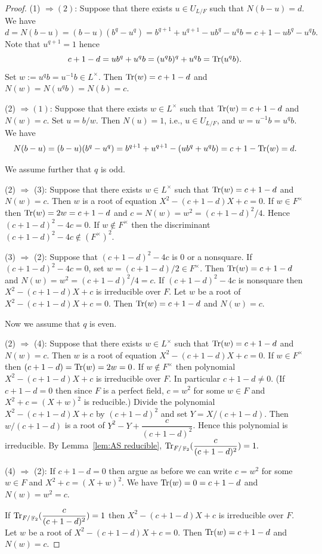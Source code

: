 \documentclass[11pt, a4paper]{amsart}
\theoremstyle{definition}
\DeclareMathOperator{\F}{\mathbb{F}}
\numberwithin{equation}{section}
\begin{document}
\begin{proof} (1) $\Rightarrow (2)$:     Suppose that there exists $u\in U_{L/F}$ such that $N(b-u)=d$. We have
    \[d=N(b-u)=(b-u)(b^q-u^q)= b^{q+1} +u^{q+1}- ub^q-u^qb=c+1- ub^q-u^qb.\]
   Note that $u^{q+1}=1$ hence  \[c+1-d= ub^q+u^qb= (u^qb)^q+u^qb={\rm Tr}(u^qb).\]
   Set $w:=u^qb=u^{-1}b\in L^\times$. Then ${\rm Tr}(w)=c+1-d$ and  
    $N(w)=N(u^qb)=N(b)=c$. 

    (2) $\Rightarrow (1)$:  Suppose that there exists $w\in L^\times$ such that ${\rm Tr}(w)=c+1-d$ and $N(w)=c$. Set $u=b/w$. Then $N(u)=1$, i.e., $u\in U_{L/F}$, and $w=u^{-1}b=u^qb$.
   We have
   \[
   N(b-u)=(b-u)(b^q-u^q)= b^{q+1} +u^{q+1}- (ub^q+u^qb)=c+1-{\rm Tr}(w)=d.
   \]

    We assume further that $q$ is odd. 

    (2) $\Rightarrow$ (3): Suppose that there exists $w\in L^\times$ such that ${\rm Tr}(w)=c+1-d$ and $N(w)=c$.
   Then $w$ is a root of equation $X^2-(c+1-d)X+c=0$. If $w\in F^\times$ then ${\rm Tr}(w)=2w=c+1-d$ and $c=N(w)=w^2=(c+1-d)^2/4$. Hence $(c+1-d)^2-4c=0$. If $w\not\in F^\times$ then the discriminant $(c+1-d)^2-4c\not\in (F^\times)^2$.

   (3) $\Rightarrow$ (2): Suppose that $(c+1-d)^2-4c$ is  0 or a nonsquare. If $(c+1-d)^2-4c=0$, set $w=(c+1-d)/2\in F^\times$. Then ${\rm Tr}(w)=c+1-d$ and $N(w)=w^2=(c+1-d)^2/4=c$. 
   If $(c+1-d)^2-4c$ is nonsquare then $X^2-(c+1-d)X+c$ is irreducible over $F$. Let $w$ be a root of $X^2-(c+1-d)X+c=0$.  
 Then ${\rm Tr}(w)=c+1-d$ and $N(w)=c$. 


 Now we assume that $q$ is even.
 
  (2) $\Rightarrow$ (4): Suppose that there exists $w\in L^\times$ such that ${\rm Tr}(w)=c+1-d$ and $N(w)=c$.
   Then $w$ is a root of equation $X^2-(c+1-d)X+c=0$. 
      If $w\in F^\times$ then $(c+1-d)={\rm Tr}(w)=2w=0$.  If $w\not\in F^\times$ then polynomial $X^2-(c+1-d)X+c$ is irreducible over $F$. In particular $c+1-d\not=0$. (If $c+1-d=0$ then since $F$ is a perfect field, $c=w^2$ for some $w\in F$ and $X^2+c=(X+w)^2$ is reducible.) Divide the polynomial $X^2-(c+1-d)X+c$ by $(c+1-d)^2$ and set $Y=X/(c+1-d)$. Then $w/(c+1-d)$ is a root of $Y^2-Y+\dfrac{c}{(c+1-d)^2}$. Hence this polynomial is irreducible. By Lemma~\ref{lem:AS reducible}, ${\rm Tr}_{F/\F_2}(\dfrac{c}{(c+1-d)^2})=1.     $

   (4) $\Rightarrow$ (2): If $c+1-d=0$  then argue as before we can write $c=w^2$ for some $w\in F$ and $X^2+c=(X+w)^2$. We have ${\rm Tr}(w)=0=c+1-d$ and $N(w)=w^2=c$. 
   
If   ${\rm Tr}_{F/\F_2}(\dfrac{c}{(c+1-d)^2})=1$ then $X^2-(c+1-d)X+c$ is irreducible over $F$. Let $w$ be a root of $X^2-(c+1-d)X+c=0$.  
 Then ${\rm Tr}(w)=c+1-d$ and $N(w)=c$. 
\end{proof}
\end{document}
